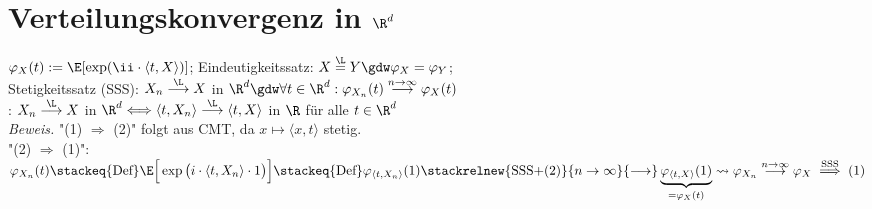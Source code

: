 	\section{Verteilungskonvergenz in \texorpdfstring{$\R^d$}{Rd}}
	 $\varphi_X(t):=\E[\exp(\ii\cdot\langle t,X\rangle)]$; Eindeutigkeitssatz: $X\overset{\L}{=}Y\gdw\varphi_X=\varphi_Y$;\\
	Stetigkeitssatz (SSS): $X_n\overset{\L}{\longrightarrow}X$ in $\R^d\gdw\forall t\in\R^d:\varphi_{X_n}(t)\overset{n\to\infty}{\longrightarrow}\varphi_X(t)$\\
	: $X_n\overset{\L}{\longrightarrow}X$ in $\R^d\Longleftrightarrow\langle t,X_n\rangle\overset{\L}{\longrightarrow}\langle t,X\rangle$ in $\R$ für alle $t\in\R^d$\\
	\textit{Beweis.} "(1) $\Rightarrow$ (2)" folgt aus CMT, da $x\mapsto\langle x,t\rangle$ stetig.\\
	"(2) $\Rightarrow$ (1)":
	$	\varphi_{X_n}(t)
		\stackeq{\text{Def}}\E\Big[\exp\big(i\cdot\langle t,X_n\rangle\cdot 1\big)\Big]
		\stackeq{\text{Def}}\varphi_{\langle t,X_n\rangle}(1)
		\stackrelnew{\text{SSS+(2)}}{n\to\infty}{\longrightarrow}\underbrace{\varphi_{\langle t,X\rangle}(1)}_{=\varphi_X(t)}
		\leadsto\varphi_{X_n}\stackrel{n\to\infty}{\longrightarrow}\varphi_X
		\stackrel{\text{SSS}}{\implies}(1)$

